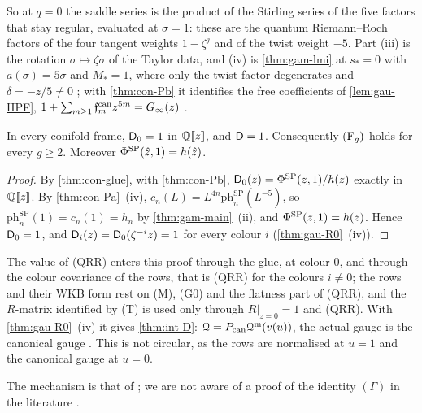 So at $q=0$ the saddle series is the product of the Stirling series of the five factors that stay regular, evaluated at $\sigma=1$: these are the quantum Riemann--Roch factors of the four tangent weights $1-\zeta^j$ and of the twist weight $-5$. Part (iii) is the rotation $\sigma\mapsto\zeta\sigma$ of the Taylor data, and (iv) is \cref{thm:gam-lmi} at $s_*=0$ with $a(\sigma)=5\sigma$ and $M_*=1$, where only the twist factor degenerates and $\delta=-z/5\neq0$ ; with \cref{thm:con-Pb} it identifies the free coefficients of \cref{lem:gau-HPF}, $1+\sum_{m\geq1}\mathfrak{f}^{\mathrm{can}}_mz^{5m}=G_{\infty}(z)$ .

\begin{thm}
\label{thm:gam-D}
In every conifold frame, $\mathsf{D}_0=1$ in $\mathbb{Q}[\![ z ]\!]$, and $\mathsf{D}=1$. Consequently $(\mathrm{F}_{g})$ holds for every $g\geq2$. Moreover $\Phi^{\mathrm{SP}}(\hat{z},1)=h(\hat{z})$.
\end{thm}

\begin{proof}
By \cref{thm:con-glue}, with \cref{thm:con-Pb}, $\mathsf{D}_0(z)=\Phi^{\mathrm{SP}}(z,1)/h(z)$ exactly in $\mathbb{Q}[\![ z ]\!]$. By \cref{thm:con-Pa}~(iv), $c_n(L)=L^{4n}\mathrm{ph}^{\mathrm{SP}}_n(L^{-5})$, so $\mathrm{ph}^{\mathrm{SP}}_n(1)=c_n(1)=h_n$ by \cref{thm:gam-main}~(ii), and $\Phi^{\mathrm{SP}}(z,1)=h(z)$. Hence $\mathsf{D}_0=1$, and $\mathsf{D}_i(z)=\mathsf{D}_0(\zeta^{-i}z)=1$ for every colour $i$ (\cref{thm:gau-R0}~(iv)).
\end{proof}

The value of (QRR) enters this proof through the glue, at colour $0$, and through the colour covariance of the rows, that is (QRR) for the colours $i\neq0$; the rows and their WKB form rest on (M), (G0) and the flatness part of (QRR), and the $R$-matrix identified by (T) is used only through $R|_{z=0}=1$ and (QRR). With \cref{thm:gau-R0}~(iv) it gives \cref{thm:int-D}: $\mathcal{Q}=P_{\mathrm{can}}\mathcal{Q}^{\mathrm m}(v(u))$, the actual gauge is the canonical gauge . This is not circular, as the rows are normalised at $u=1$ and the canonical gauge at $u=0$.

The mechanism is that of \cite[\S10]{MR1901075}; we are not aware of a proof of the identity $(\Gamma)$ in the literature .
